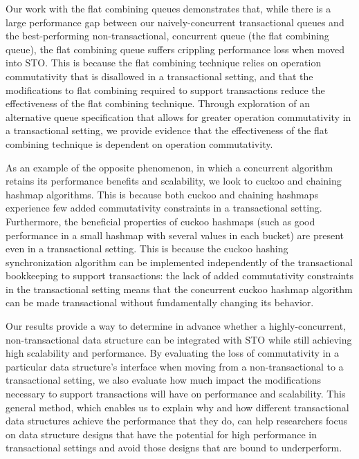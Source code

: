 Our work with the flat combining queues demonstrates that, while there is a large performance gap between our naively-concurrent transactional queues and the best-performing non-transactional, concurrent queue (the flat combining queue), the flat combining queue suffers crippling performance loss when moved into STO. This is because the flat combining technique relies on operation commutativity that is disallowed in a transactional setting, and that the modifications to flat combining required to support transactions reduce the effectiveness of the flat combining technique. Through exploration of an alternative queue specification that allows for greater operation commutativity in a transactional setting, we provide evidence that the effectiveness of the flat combining technique is dependent on operation commutativity.

As an example of the opposite phenomenon, in which a concurrent algorithm retains its performance benefits and scalability, we look to cuckoo and chaining hashmap algorithms. This is because both cuckoo and chaining hashmaps experience few added commutativity constraints in a transactional setting.
Furthermore, the beneficial properties of cuckoo hashmaps (such as good performance in a small hashmap with several values in each bucket) are present even in a transactional setting. This is because the cuckoo hashing synchronization algorithm can be implemented independently of the transactional bookkeeping to support transactions: the lack of added commutativity constraints in the transactional setting means that the concurrent cuckoo hashmap algorithm can be made transactional without fundamentally changing its behavior.

Our results provide a way to determine in advance whether a highly-concurrent, non-transactional data structure can be integrated with STO while still achieving high scalability and performance. By evaluating the loss of commutativity in a particular data structure's interface when moving from a non-transactional to a transactional setting, we also evaluate how much impact the modifications necessary to support transactions will have on performance and scalability. 
This general method, which enables us to explain why and how different transactional data structures achieve the performance that they do, can help researchers focus on data structure designs that have the potential for high performance in transactional settings and avoid those designs that are bound to underperform.
